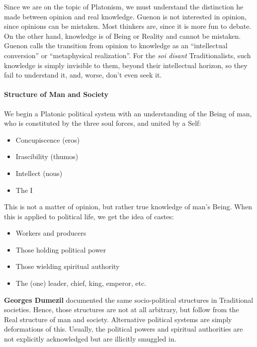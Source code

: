 Since we are on the topic of Platonism, we must understand the distinction he made between opinion and real knowledge. Guenon is not interested in opinion, since opinions can be mistaken. Most thinkers are, since it is more fun to debate. On the other hand, knowledge is of Being or Reality and cannot be mistaken. Guenon calls the transition from opinion to knowledge as an ``intellectual conversion'' or ``metaphysical realization''. For the \emph{soi disant} Traditionalists, such knowledge is simply invisible to them, beyond their intellectual horizon, so they fail to understand it, and, worse, don't even seek it.

\paragraph{Structure of Man and Society}


We begin a Platonic political system with an understanding of the Being of man, who is constituted by the three soul forces, and united by a Self:

\begin{itemize}


\item Concupiscence (eros)

\item Irascibility (thumos)

\item Intellect (nous)

\item The I
\end{itemize}


This is not a matter of opinion, but rather true knowledge of man's Being. When this is applied to political life, we get the idea of castes:

\begin{itemize}


\item Workers and producers

\item Those holding political power

\item Those wielding spiritual authority

\item The (one) leader, chief, king, emperor, etc.
\end{itemize}


\textbf{Georges Dumezil} documented the same socio-political structures in Traditional societies. Hence, those structures are not at all arbitrary, but follow from the Real structure of man and society. Alternative political systems are simply deformations of this. Usually, the political powers and spiritual authorities are not explicitly acknowledged but are illicitly smuggled in.

